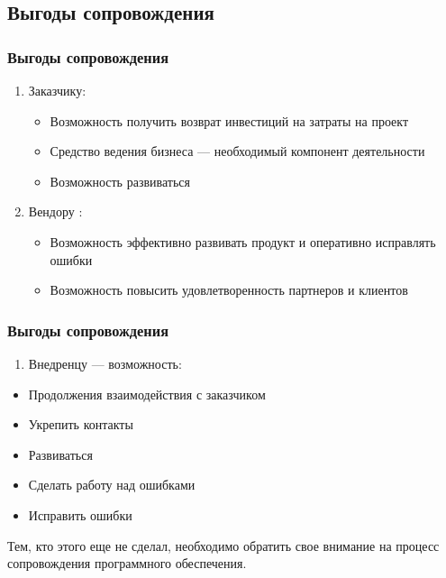 \documentclass{../industrial-development}
\begin{document}
\lecturenotes

\subsection{Выгоды сопровождения}
\begin{frame} \frametitle{Выгоды сопровождения}
	\begin{enumerate} \item Заказчику: 
	\begin{itemize} 
		\item Возможность получить возврат инвестиций на затраты на проект 
		\item Средство ведения бизнеса — необходимый компонент деятельности 
		\item Возможность развиваться 
	\end{itemize}
	\item Вендору : 
	\begin{itemize} 
		\item Возможность эффективно развивать продукт и оперативно исправлять ошибки 
		\item Возможность повысить удовлетворенность партнеров и клиентов 
	\end{itemize}
	\end{enumerate}
\end{frame}

\lecturenotes

\begin{frame} \frametitle{Выгоды сопровождения}
	\begin{enumerate}[3] \item Внедренцу --- возможность: \end{enumerate}
	\begin{itemize} 
		\item Продолжения взаимодействия с заказчиком 
		\item Укрепить контакты 
		\item Развиваться 
		\item Сделать работу над ошибками 
		\item Исправить ошибки 
	\end{itemize}
\end{frame}

\lecturenotes
Тем, кто этого еще не сделал, необходимо обратить свое внимание на процесс сопровождения программного обеспечения. 

\end{document}
